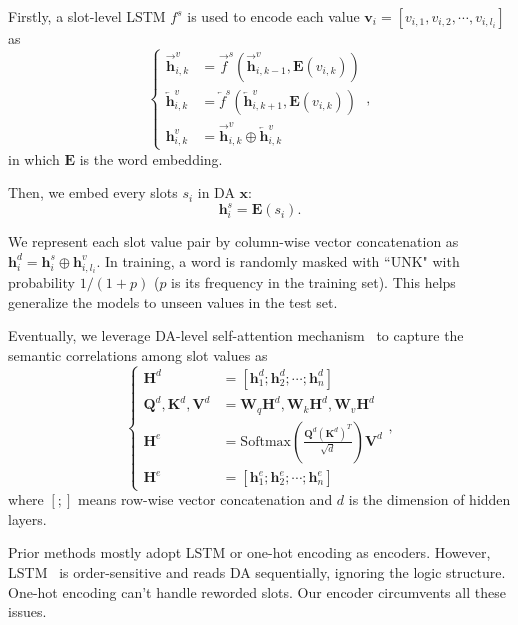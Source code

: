 \documentclass[letterpaper]{article} %
\begin{document}
	Firstly, a slot-level LSTM $f^{s}$ is used to encode each value $\mathbf{v}_i = [v_{i, 1}, v_{i, 2}, \cdots, v_{i, l_i}]$ as
	\begin{equation}
	\left\{\begin{aligned}
	\overrightarrow{\mathbf{h}}_{i,k}^v & = \overrightarrow{f}^s(\overrightarrow{\mathbf{h}}_{i,k-1}^v, \mathbf{E}(v_{i, k})) \\
	\overleftarrow{\mathbf{h}}_{i,k}^v & = \overleftarrow{f}^s(\overleftarrow{\mathbf{h}}_{i,k+1}^v, \mathbf{E}(v_{i, k})) \\
	\mathbf{h}_{i,k}^v & = \overrightarrow{\mathbf{h}}_{i,k}^v \oplus \overleftarrow{\mathbf{h}}_{i,k}^v
	\end{aligned}\right.,
	\end{equation}
	in which $\mathbf{E}$ is the word embedding.

	Then, we embed every slots $s_i$ in DA $\mathbf{x}$:
	\begin{equation}
	\mathbf{h}^s_i = \mathbf{E}(s_i).
	\end{equation}

	We represent each slot value pair by column-wise vector concatenation as $\mathbf{h}^d_i = \mathbf{h}^s_i \oplus \mathbf{h}_{i,l_i}^v$.  In training, a word is randomly masked with ``UNK" with probability $1 / (1 + p)$ ($p$ is its frequency in the training set). This helps generalize the models to unseen values in the test set.

	Eventually, we leverage DA-level self-attention mechanism~\citep{vaswani2017attention} to capture the semantic correlations among slot values as
	\begin{equation}
	\left\{\begin{aligned}
	\mathbf{H}^d & = [\mathbf{h}_1^d; \mathbf{h}_2^d; \cdots; \mathbf{h}_n^d] \\
	\mathbf{Q}^d, \mathbf{K}^d, \mathbf{V}^d & = \mathbf{W}_q\mathbf{H}^d, \mathbf{W}_k\mathbf{H}^d, \mathbf{W}_v\mathbf{H}^d \\
	\mathbf{H}^e & = \mathrm{Softmax}(\frac{\mathbf{Q}^d(\mathbf{K}^d)^T}{\sqrt{d}})\mathbf{V}^d \\
	\mathbf{H}^e & = [\mathbf{h}_1^e; \mathbf{h}_2^e; \cdots; \mathbf{h}_n^e]
	\end{aligned}\right.,
	\end{equation}
	where $[;]$ means row-wise vector concatenation and $d$ is the dimension of hidden layers.

	Prior methods mostly adopt LSTM or one-hot encoding as encoders. However, LSTM~\citep{hochreiter1997long} is order-sensitive and reads DA sequentially, ignoring the logic structure. One-hot encoding can't handle reworded slots. Our encoder circumvents all these issues.
\end{document}
